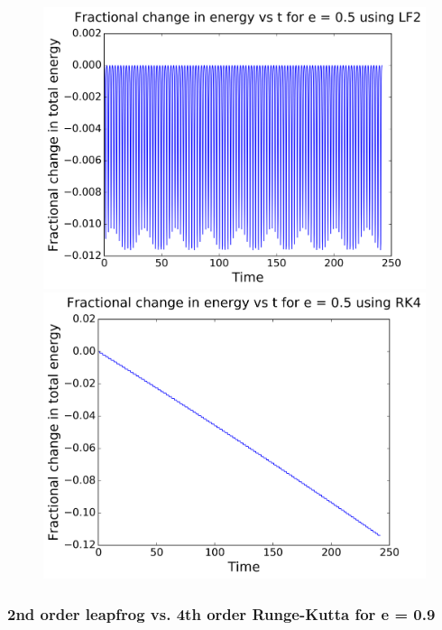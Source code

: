 \begin{figure}[H]
	\centering
	\begin{minipage}[b]{0.48\linewidth}
		\includegraphics[width=\linewidth]{plots_p1/LF2_e05_energy.png}
	\end{minipage}
	\begin{minipage}[b]{0.48\linewidth}
		\includegraphics[width=\linewidth]{plots_p1/RK4_e05_energy.png}
	\end{minipage}
\end{figure}



\subsubsection*{2nd order leapfrog vs. 4th order Runge-Kutta for e = 0.9}

